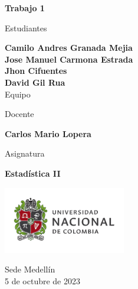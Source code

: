 \begin{titlepage}
   \Large{
   \begin{center}
       \vspace*{1cm}

       \textbf{Trabajo 1}

            
       \vspace{1.5cm}
       
       Estudiantes
       
       \vspace{0.5cm}
        
	\textbf{Camilo Andres Granada Mejia}\\    

  \textbf{Jose Manuel Carmona Estrada}\\

	\textbf{Jhon Cifuentes}\\

	\textbf{David Gil Rua}\\
	

              \vspace{1cm}
      Equipo 
       
       Docente
       
       \vspace{0.5cm}

       \textbf{Carlos Mario Lopera}
       
       \vspace{0.4cm}

       \vspace{1.4cm}
       
       Asignatura
       
       \vspace{0.5cm}

       \textbf{Estadística II}

       \vfill

            
     
       \includegraphics[width=0.4\textwidth]{logounal.png}
            
       Sede Medellín\\
       5 de octubre de 2023
       
   \end{center}
   }
\end{titlepage}